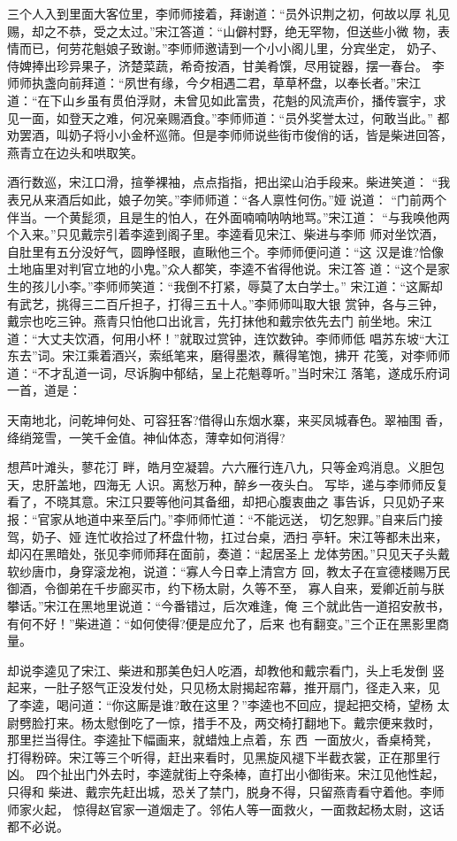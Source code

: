 三个人入到里面大客位里，李师师接着，拜谢道：“员外识荆之初，何故以厚
礼见赐，却之不恭，受之太过。”宋江答道：“山僻村野，绝无罕物，但送些小微
物，表情而已，何劳花魁娘子致谢。”李师师邀请到一个小小阁儿里，分宾坐定，
奶子、侍婢捧出珍异果子，济楚菜蔬，希奇按酒，甘美肴馔，尽用锭器，摆一春台。
李师师执盏向前拜道：“夙世有缘，今夕相遇二君，草草杯盘，以奉长者。”宋江
道：“在下山乡虽有贯伯浮财，未曾见如此富贵，花魁的风流声价，播传寰宇，求
见一面，如登天之难，何况亲赐酒食。”李师师道：“员外奖誉太过，何敢当此。”
都劝罢酒，叫奶子将小小金杯巡筛。但是李师师说些街市俊俏的话，皆是柴进回答，
燕青立在边头和哄取笑。

酒行数巡，宋江口滑，揎拳裸袖，点点指指，把出梁山泊手段来。柴进笑道：
“我表兄从来酒后如此，娘子勿笑。”李师师道：“各人禀性何伤。”娅说道：
“门前两个伴当。一个黄髭须，且是生的怕人，在外面喃喃呐呐地骂。”宋江道：
“与我唤他两个入来。”只见戴宗引着李逵到阁子里。李逵看见宋江、柴进与李师
师对坐饮酒，自肚里有五分没好气，圆睁怪眼，直瞅他三个。李师师便问道：“这
汉是谁?恰像土地庙里对判官立地的小鬼。”众人都笑，李逵不省得他说。宋江答
道：“这个是家生的孩儿小李。”李师师笑道：“我倒不打紧，辱莫了太白学士。”
宋江道：“这厮却有武艺，挑得三二百斤担子，打得三五十人。”李师师叫取大银
赏钟，各与三钟，戴宗也吃三钟。燕青只怕他口出讹言，先打抹他和戴宗依先去门
前坐地。宋江道：“大丈夫饮酒，何用小杯！”就取过赏钟，连饮数钟。李师师低
唱苏东坡“大江东去”词。宋江乘着酒兴，索纸笔来，磨得墨浓，蘸得笔饱，拂开
花笺，对李师师道：“不才乱道一词，尽诉胸中郁结，呈上花魁尊听。”当时宋江
落笔，遂成乐府词一首，道是：

天南地北，问乾坤何处、可容狂客?借得山东烟水寨，来买凤城春色。翠袖围
香，绛绡笼雪，一笑千金值。神仙体态，薄幸如何消得?

想芦叶滩头，蓼花汀
畔，皓月空凝碧。六六雁行连八九，只等金鸡消息。义胆包天，忠肝盖地，四海无
人识。离愁万种，醉乡一夜头白。
写毕，递与李师师反复看了，不晓其意。宋江只要等他问其备细，却把心腹衷曲之
事告诉，只见奶子来报：“官家从地道中来至后门。”李师师忙道：“不能远送，
切乞恕罪。”自来后门接驾，奶子、娅连忙收拾过了杯盘什物，扛过台桌，洒扫
亭轩。宋江等都未出来，却闪在黑暗处，张见李师师拜在面前，奏道：“起居圣上
龙体劳困。”只见天子头戴软纱唐巾，身穿滚龙袍，说道：“寡人今日幸上清宫方
回，教太子在宣德楼赐万民御酒，令御弟在千步廊买市，约下杨太尉，久等不至，
寡人自来，爱卿近前与朕攀话。”宋江在黑地里说道：“今番错过，后次难逢，俺
三个就此告一道招安赦书，有何不好！”柴进道：“如何使得?便是应允了，后来
也有翻变。”三个正在黑影里商量。

却说李逵见了宋江、柴进和那美色妇人吃酒，却教他和戴宗看门，头上毛发倒
竖起来，一肚子怒气正没发付处，只见杨太尉揭起帘幕，推开扇门，径走入来，见
了李逵，喝问道：“你这厮是谁?敢在这里？”李逵也不回应，提起把交椅，望杨
太尉劈脸打来。杨太慰倒吃了一惊，措手不及，两交椅打翻地下。戴宗便来救时，
那里拦当得住。李逵扯下幅画来，就蜡烛上点着，东西，一面放火，香桌椅凳，
打得粉碎。宋江等三个听得，赶出来看时，见黑旋风褪下半截衣裳，正在那里行凶。
四个扯出门外去时，李逵就街上夺条棒，直打出小御街来。宋江见他性起，只得和
柴进、戴宗先赶出城，恐关了禁门，脱身不得，只留燕青看守着他。李师师家火起，
惊得赵官家一道烟走了。邻佑人等一面救火，一面救起杨太尉，这话都不必说。

